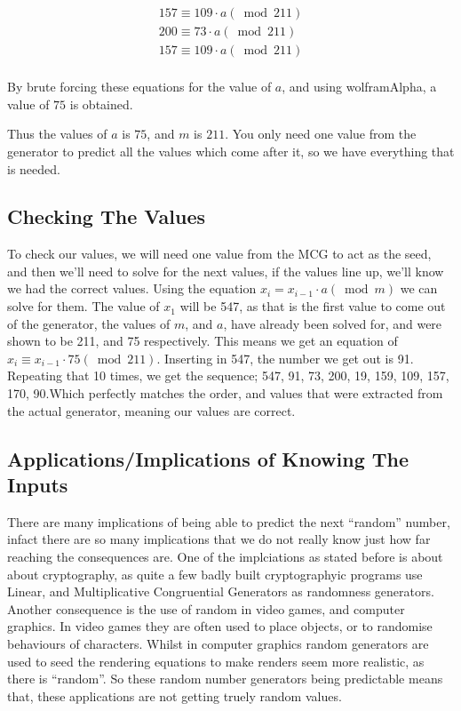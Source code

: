 \documentclass[12pft, english]{article}
\begin{document}
\begin{multicols}{2}
  \begin{gather*}
      157 \equiv 109 \cdot a (\bmod 211) \\
      200 \equiv 73 \cdot a (\bmod 211)  \\
      157 \equiv 109 \cdot a (\bmod 211) \\
    \end{gather*}

    By brute forcing these equations for the value of \(a\), and using wolframAlpha, a value of \(75\) is obtained.

    Thus the values of \(a\) is \(75\), and \(m\) is \(211\). You only need one value from the generator to predict all the values which come after it, so we have everything that is needed.

    \subsection{Checking The Values}
    To check our values, we will need one value from the MCG to act as the seed, and then we'll need to solve for the next values, if the values line up, we'll know we had the correct values. Using the equation \(x_{i} = x_{i-1} \cdot a (\bmod m)\) we can solve for them. The value of \(x_{1}\) will be 547, as that is the first value to come out of the generator, the values of \(m\), and \(a\), have already been solved for, and were shown to be 211, and 75 respectively. This means we get an equation of \( x_{i} \equiv x_{i-1} \cdot 75 (\bmod 211)\). Inserting in 547, the number we get out is 91. Repeating that 10 times, we get the sequence; 547, 91, 73, 200, 19, 159, 109, 157, 170, 90.Which perfectly matches the order, and values that were extracted from the actual generator, meaning our values are correct.

    \subsection{Applications/Implications of Knowing The Inputs}
    There are many implications of being able to predict the next ``random'' number, infact there are so many implications that we do not really know just how far reaching the consequences are. One of the implciations as stated before is about about cryptography, as quite a few badly built cryptographyic programs use Linear, and Multiplicative Congruential Generators as randomness generators. Another consequence is the use of random in video games, and computer graphics. In video games they are often used to place objects, or to randomise behaviours of characters. Whilst in computer graphics random generators are used to seed the rendering equations to make renders seem more realistic, as there is ``random''. So these random number generators being predictable means that, these applications are not getting truely random values.


\end{multicols}
\end{document}
